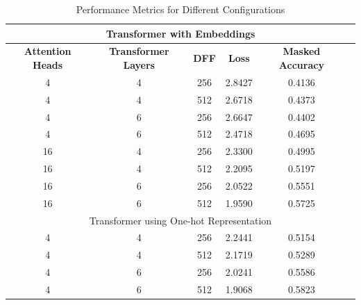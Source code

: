 \documentclass[12pt]{article} \usepackage{COSC420style} \usepackage{soul}
\begin{document}
\begin{table}[htbp]
	\centering
	\caption{Performance Metrics for Different Configurations}
	\label{tab:performance_metrics}
	\begin{tabular}{cccccc}
		\toprule
		\multicolumn{6}{c}{Transformer with Embeddings}                                                                  \\
		\midrule
		\textbf{Attention Heads} & \textbf{Transformer Layers} & \textbf{DFF} & \textbf{Loss} & \textbf{Masked Accuracy} \\
		4                        & 4                           & 256          & 2.8427        & 0.4136                   \\
		4                        & 4                           & 512          & 2.6718        & 0.4373                   \\
		4                        & 6                           & 256          & 2.6647        & 0.4402                   \\
		4                        & 6                           & 512          & 2.4718        & 0.4695                   \\
		16                       & 4                           & 256          & 2.3300        & 0.4995                   \\
		16                       & 4                           & 512          & 2.2095        & 0.5197                   \\
		16                       & 6                           & 256          & 2.0522        & 0.5551                   \\
		16                       & 6                           & 512          & 1.9590        & 0.5725                   \\
		\midrule
		\multicolumn{6}{c}{Transformer using One-hot Representation}                                                     \\
		\midrule
		4                        & 4                           & 256          & 2.2441        & 0.5154                   \\
		4                        & 4                           & 512          & 2.1719        & 0.5289                   \\
		4                        & 6                           & 256          & 2.0241        & 0.5586                   \\
		4                        & 6                           & 512          & 1.9068        & 0.5823                   \\

\end{tabular}
\end{table}
\end{document}
